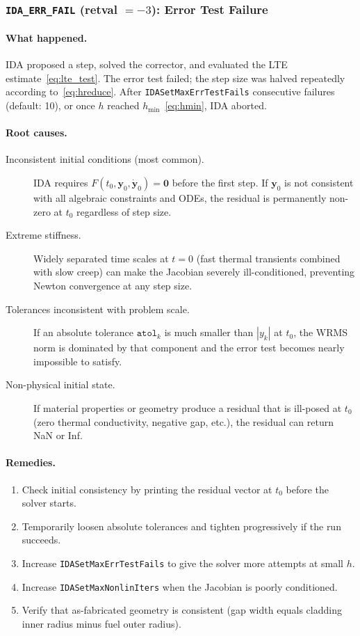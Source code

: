 \begin{refsection}
\subsubsection{\texttt{IDA\_ERR\_FAIL} (retval $= -3$): Error Test Failure}

\paragraph{What happened.} IDA proposed a step, solved the corrector, and evaluated the LTE estimate~\eqref{eq:lte_test}. The error test failed; the step size was halved repeatedly according to~\eqref{eq:hreduce}. After \texttt{IDASetMaxErrTestFails} consecutive failures (default: 10), or once $h$ reached $h_\mathrm{min}$~\eqref{eq:hmin}, IDA aborted.

\paragraph{Root causes.}
\begin{description}
\item[Inconsistent initial conditions (most common).] IDA requires $F(t_0,\mathbf{y}_0,\dot{\mathbf{y}}_0) = \mathbf{0}$ before the first step.  If $\mathbf{y}_0$ is not consistent with all algebraic constraints and ODEs, the residual is permanently non-zero at $t_0$ regardless of step size.
\item[Extreme stiffness.] Widely separated time scales at $t=0$ (fast thermal transients combined with slow creep) can make the Jacobian severely ill-conditioned, preventing Newton convergence at any step size.
\item[Tolerances inconsistent with problem scale.] If an absolute tolerance $\mathtt{atol}_k$ is much smaller than $|y_k|$ at $t_0$, the WRMS norm is dominated by that component and the error test becomes nearly impossible to satisfy.
\item[Non-physical initial state.] If material properties or geometry produce a residual that is ill-posed at $t_0$ (zero thermal conductivity, negative gap, etc.), the residual can return NaN or Inf.
\end{description}

\paragraph{Remedies.}
\begin{enumerate}
\item Check initial consistency by printing the residual vector at $t_0$ before the solver starts.
\item Temporarily loosen absolute tolerances and tighten progressively if the run succeeds.
\item Increase \texttt{IDASetMaxErrTestFails} to give the solver more attempts at small $h$.
\item Increase \texttt{IDASetMaxNonlinIters} when the Jacobian is poorly conditioned.
\item Verify that as-fabricated geometry is consistent (gap width equals cladding inner radius minus fuel outer radius).
\end{enumerate}


\end{refsection}
